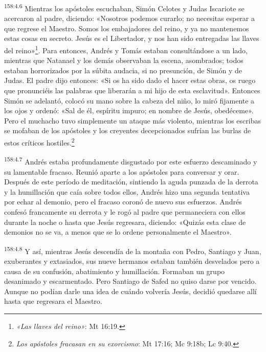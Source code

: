 {\par 
\textsuperscript{158:4.6} Mientras los apóstoles escuchaban, Simón Celotes y Judas Iscariote se acercaron al padre, diciendo: «Nosotros podemos curarlo; no necesitas esperar a que regrese el Maestro. Somos los embajadores del reino, y ya no mantenemos estas cosas en secreto. Jesús es el Libertador, y nos han sido entregadas las llaves del reino»\footnote{\textit{«Las llaves del reino»}: Mt 16:19.}. Para entonces, Andrés y Tomás estaban consultándose a un lado, mientras que Natanael y los demás observaban la escena, asombrados; todos estaban horrorizados por la súbita audacia, si no presunción, de Simón y de Judas. El padre dijo entonces: «Si os ha sido dado el hacer estas obras, os ruego que pronunciéis las palabras que liberarán a mi hijo de esta esclavitud». Entonces Simón se adelantó, colocó su mano sobre la cabeza del niño, lo miró fijamente a los ojos y ordenó: «Sal de él, espíritu impuro; en nombre de Jesús, obedéceme». Pero el muchacho tuvo simplemente un ataque más violento, mientras los escribas se mofaban de los apóstoles y los creyentes decepcionados sufrían las burlas de estos críticos hostiles.\footnote{\textit{Los apóstoles fracasan en su exorcismo}: Mt 17:16; Mc 9:18b; Lc 9:40.}

\par 
\textsuperscript{158:4.7} Andrés estaba profundamente disgustado por este esfuerzo descaminado y su lamentable fracaso. Reunió aparte a los apóstoles para conversar y orar. Después de este período de meditación, sintiendo la aguda punzada de la derrota y la humillación que caía sobre todos ellos, Andrés hizo una segunda tentativa por echar al demonio, pero el fracaso coronó de nuevo sus esfuerzos. Andrés confesó francamente su derrota y le rogó al padre que permaneciera con ellos durante la noche o hasta que Jesús regresara, diciendo: «Quizás esta clase de demonios no se va, a menos que se lo ordene personalmente el Maestro».

\par 
\textsuperscript{158:4.8} Y así, mientras Jesús descendía de la montaña con Pedro, Santiago y Juan, exuberantes y extasiados, sus nueve hermanos estaban también desvelados pero a causa de su confusión, abatimiento y humillación. Formaban un grupo desanimado y escarmentado. Pero Santiago de Safed no quiso darse por vencido. Aunque no podían darle una idea de cuándo volvería Jesús, decidió quedarse allí hasta que regresara el Maestro.

}
